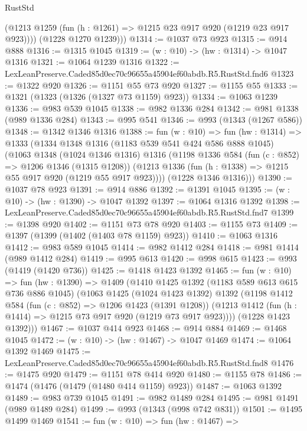 \begin{lexlean}{RustStd}
\begin{coremodule}
          (@1213 @1259 (fun (h : @1261) => @1215 @23 @917 @920 (@1219 @23 @917 @923))))
        (@1228 @1270 @1239)))
@1314 := @1037 @73 @923
@1315 := @914 @888
@1316 := @1315 @1045
@1319 := (w : @10) -> (hw : @1314) -> @1047 @1316
@1321 := @1064 @1239 @1316
@1322 := LexLeanPreserve.Caded85d0ec70c96655a45904ef60abdb.R5.RustStd.fnd6
@1323 := @1322 @920
@1326 := @1151 @55 @73 @920
@1327 := @1155 @55
@1333 := @1321 (@1323 (@1326 (@1327 @73 @1159) @923))
@1334 := @1063 @1239
@1336 := @983 @539 @1045
@1338 := @982 @1336 @284
@1342 := @981 @1338 (@989 @1336 @284)
@1343 := @995 @541
@1346 := @993 (@1343 (@1267 @586))
@1348 := @1342 @1346 @1316
@1388 := fun (w : @10) =>
  fun (hw : @1314) =>
  @1333
    (@1334
      @1348
      @1316
      (@1183 @539 @541 @424 @586 @888 @1045)
      (@1063
        @1348
        (@1024 @1346 @1316)
        @1316
        (@1198
          @1336
          @584
          (fun (c : @852) => @1206 @1346 (@1315 @1208))
          (@1213 @1336 (fun (h : @1338) => @1215 @55 @917 @920 (@1219 @55 @917 @923))))
        (@1228 @1346 @1316)))
@1390 := @1037 @78 @923
@1391 := @914 @886
@1392 := @1391 @1045
@1395 := (w : @10) -> (hw : @1390) -> @1047 @1392
@1397 := @1064 @1316 @1392
@1398 := LexLeanPreserve.Caded85d0ec70c96655a45904ef60abdb.R5.RustStd.fnd7
@1399 := @1398 @920
@1402 := @1151 @73 @78 @920
@1403 := @1155 @73
@1409 := @1397 (@1399 (@1402 (@1403 @78 @1159) @923))
@1410 := @1063 @1316
@1412 := @983 @589 @1045
@1414 := @982 @1412 @284
@1418 := @981 @1414 (@989 @1412 @284)
@1419 := @995 @613
@1420 := @998 @615
@1423 := @993 (@1419 (@1420 @736))
@1425 := @1418 @1423 @1392
@1465 := fun (w : @10) =>
  fun (hw : @1390) =>
  @1409
    (@1410
      @1425
      @1392
      (@1183 @589 @613 @615 @736 @886 @1045)
      (@1063
        @1425
        (@1024 @1423 @1392)
        @1392
        (@1198
          @1412
          @584
          (fun (c : @852) => @1206 @1423 (@1391 @1208))
          (@1213 @1412 (fun (h : @1414) => @1215 @73 @917 @920 (@1219 @73 @917 @923))))
        (@1228 @1423 @1392)))
@1467 := @1037 @414 @923
@1468 := @914 @884
@1469 := @1468 @1045
@1472 := (w : @10) -> (hw : @1467) -> @1047 @1469
@1474 := @1064 @1392 @1469
@1475 := LexLeanPreserve.Caded85d0ec70c96655a45904ef60abdb.R5.RustStd.fnd8
@1476 := @1475 @920
@1479 := @1151 @78 @414 @920
@1480 := @1155 @78
@1486 := @1474 (@1476 (@1479 (@1480 @414 @1159) @923))
@1487 := @1063 @1392
@1489 := @983 @739 @1045
@1491 := @982 @1489 @284
@1495 := @981 @1491 (@989 @1489 @284)
@1499 := @993 (@1343 (@998 @742 @831))
@1501 := @1495 @1499 @1469
@1541 := fun (w : @10) =>
  fun (hw : @1467) =>

\end{coremodule}
\end{lexlean}
